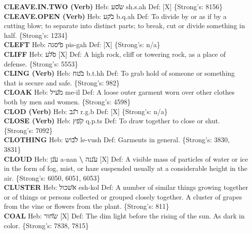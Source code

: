 {\textbf{CLEAVE.IN.TWO (Verb)} Heb: {\large\H שסע} sh.s.ah Def: {[}X{]} \{Strong's: 8156\}\hfill{}\\

\textbf{CLEAVE.OPEN (Verb)} Heb: {\large\H בקע} b.q.ah Def: To divide by or as if by a cutting blow; to separate into distinct parts; to break, cut or divide something in half. \{Strong's: 1234\}\hfill{}\\

\textbf{CLEFT} Heb: {\large\H פיסגה} pis-gah Def: {[}X{]} \{Strong's: n/a\}\hfill{}\\

\textbf{CLIFF} Heb: {\large\H סלע} {[}X{]} Def: A high rock, cliff or towering rock, as a place of defense. \{Strong's: 5553\}\hfill{}\\

\textbf{CLING (Verb)} Heb: {\large\H בטח} b.t.hh Def: To grab hold of someone or something that is secure and safe. \{Strong's: 982\}\hfill{}\\

\textbf{CLOAK} Heb: {\large\H מעיל} me-il Def: A loose outer garment worn over other clothes both by men and women. \{Strong's: 4598\}\hfill{}\\

\textbf{CLOD (Verb)} Heb: {\large\H רגב} r.g.b Def: {[}X{]} \{Strong's: n/a\}\hfill{}\\

\textbf{CLOSE (Verb)} Heb: {\large\H קפץ} q.p.ts Def: To draw together to close or shut. \{Strong's: 7092\}\hfill{}\\

\textbf{CLOTHING} Heb: {\large\H לבוש} le-vush Def: Garments in general. \{Strong's: 3830, 3831\}\hfill{}\\

\textbf{CLOUD} Heb: {\large\H ענן} a-nan \textbf{\textbackslash{}} {\large\H עננה} {[}X{]} Def: A visible mass of particles of water or ice in the form of fog, mist, or haze suspended usually at a considerable height in the air. \{Strong's: 6050, 6051, 6053\}\hfill{}\\

\textbf{CLUSTER} Heb: {\large\H אשכול} esh-kol Def: A number of similar things growing together or of things or persons collected or grouped closely together. A cluster of grapes from the vine or flowers from the plant. \{Strong's: 811\}\hfill{}\\

\textbf{COAL} Heb: {\large\H שחור} {[}X{]} Def: The dim light before the rising of the sun. As dark in color. \{Strong's: 7838, 7815\}\hfill{}\\

}
